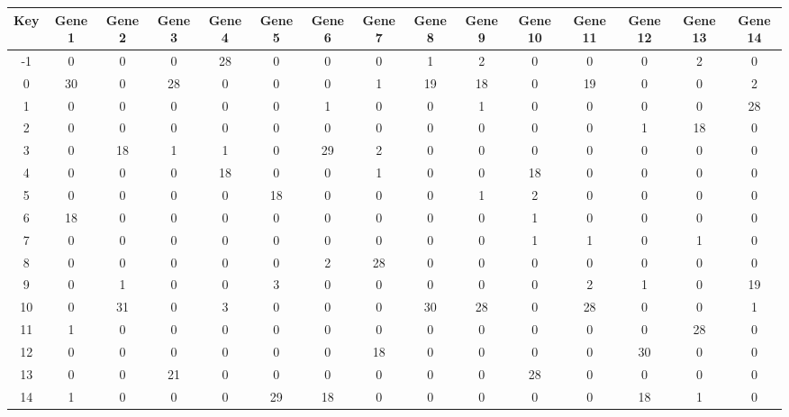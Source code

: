 \begin{tabular}{|c|c|c|c|c|c|c|c|c|c|c|c|c|c|c|}
\hline
Key & Gene 1 & Gene 2 & Gene 3 & Gene 4 & Gene 5 & Gene 6 & Gene 7 & Gene 8 & Gene 9 & Gene 10 & Gene 11 & Gene 12 & Gene 13 & Gene 14 \\
\hline
-1 & 0 & 0 & 0 & 28 & 0 & 0 & 0 & 1 & 2 & 0 & 0 & 0 & 2 & 0 \\
0 & 30 & 0 & 28 & 0 & 0 & 0 & 1 & 19 & 18 & 0 & 19 & 0 & 0 & 2 \\
1 & 0 & 0 & 0 & 0 & 0 & 1 & 0 & 0 & 1 & 0 & 0 & 0 & 0 & 28 \\
2 & 0 & 0 & 0 & 0 & 0 & 0 & 0 & 0 & 0 & 0 & 0 & 1 & 18 & 0 \\
3 & 0 & 18 & 1 & 1 & 0 & 29 & 2 & 0 & 0 & 0 & 0 & 0 & 0 & 0 \\
4 & 0 & 0 & 0 & 18 & 0 & 0 & 1 & 0 & 0 & 18 & 0 & 0 & 0 & 0 \\
5 & 0 & 0 & 0 & 0 & 18 & 0 & 0 & 0 & 1 & 2 & 0 & 0 & 0 & 0 \\
6 & 18 & 0 & 0 & 0 & 0 & 0 & 0 & 0 & 0 & 1 & 0 & 0 & 0 & 0 \\
7 & 0 & 0 & 0 & 0 & 0 & 0 & 0 & 0 & 0 & 1 & 1 & 0 & 1 & 0 \\
8 & 0 & 0 & 0 & 0 & 0 & 2 & 28 & 0 & 0 & 0 & 0 & 0 & 0 & 0 \\
9 & 0 & 1 & 0 & 0 & 3 & 0 & 0 & 0 & 0 & 0 & 2 & 1 & 0 & 19 \\
10 & 0 & 31 & 0 & 3 & 0 & 0 & 0 & 30 & 28 & 0 & 28 & 0 & 0 & 1 \\
11 & 1 & 0 & 0 & 0 & 0 & 0 & 0 & 0 & 0 & 0 & 0 & 0 & 28 & 0 \\
12 & 0 & 0 & 0 & 0 & 0 & 0 & 18 & 0 & 0 & 0 & 0 & 30 & 0 & 0 \\
13 & 0 & 0 & 21 & 0 & 0 & 0 & 0 & 0 & 0 & 28 & 0 & 0 & 0 & 0 \\
14 & 1 & 0 & 0 & 0 & 29 & 18 & 0 & 0 & 0 & 0 & 0 & 18 & 1 & 0 \\
\hline
\end{tabular}